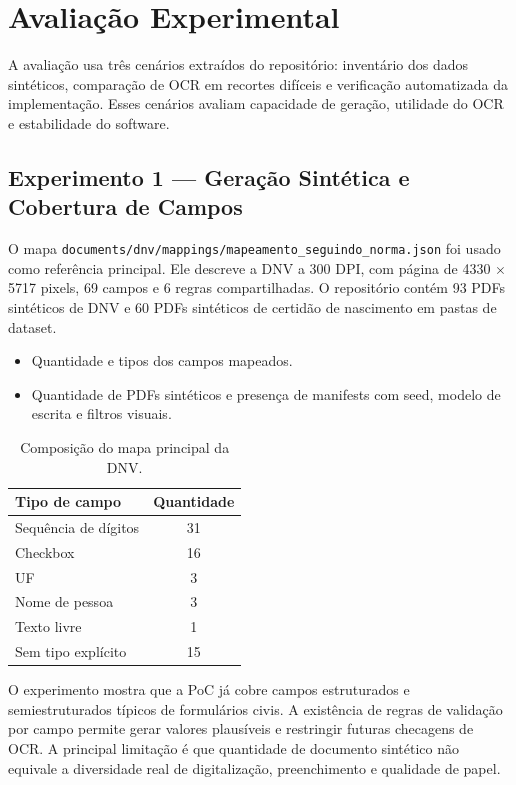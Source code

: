 \documentclass[12pt,a4paper]{article}
\begin{document}
\section{Avaliação Experimental}
\label{sec:avaliacao}

A avaliação usa três cenários extraídos do repositório: inventário dos dados sintéticos, comparação de OCR em recortes difíceis e verificação automatizada da implementação. Esses cenários avaliam capacidade de geração, utilidade do OCR e estabilidade do software.

\subsection{Experimento 1 — Geração Sintética e Cobertura de Campos}

O mapa \texttt{documents/dnv/mappings/mapeamento\_seguindo\_norma.json} foi usado como referência principal. Ele descreve a DNV a 300 DPI, com página de 4330 $\times$ 5717 pixels, 69 campos e 6 regras compartilhadas. O repositório contém 93 PDFs sintéticos de DNV e 60 PDFs sintéticos de certidão de nascimento em pastas de dataset.

\begin{itemize}
    \item{} Quantidade e tipos dos campos mapeados.
    \item{} Quantidade de PDFs sintéticos e presença de manifests com seed, modelo de escrita e filtros visuais.
\end{itemize}

\begin{table}[H]
    \centering
    \caption{Composição do mapa principal da DNV.}
    \begin{tabular}{lc}
        \toprule
        \textbf{Tipo de campo} & \textbf{Quantidade} \\
        \midrule
        Sequência de dígitos & 31 \\
        Checkbox & 16 \\
        UF & 3 \\
        Nome de pessoa & 3 \\
        Texto livre & 1 \\
        Sem tipo explícito & 15 \\
        \bottomrule
    \end{tabular}
    \label{tab:mapa-dnv}
\end{table}

O experimento mostra que a PoC já cobre campos estruturados e semiestruturados típicos de formulários civis. A existência de regras de validação por campo permite gerar valores plausíveis e restringir futuras checagens de OCR. A principal limitação é que quantidade de documento sintético não equivale a diversidade real de digitalização, preenchimento e qualidade de papel.
\end{document}
